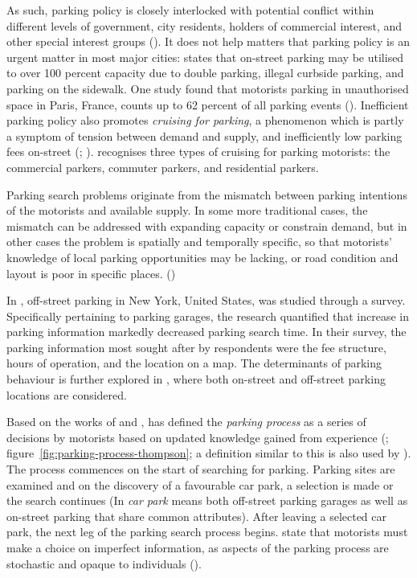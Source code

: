 As such, parking policy is closely interlocked with potential conflict within different levels of government, city residents, holders of commercial interest, and other special interest groups (\cite{Ker1988}). It does not help matters that parking policy is an urgent matter in most major cities: \cite{Arnott2006} states that on-street parking may be utilised to over 100 percent capacity due to double parking, illegal curbside parking, and parking on the sidewalk. One study found that motorists parking in unauthorised space in Paris, France, counts up to 62 percent of all parking events (\cite{Gantelet2006}). Inefficient parking policy also promotes \textit{cruising for parking}, a phenomenon which is partly a symptom of tension between demand and supply, and inefficiently low parking fees on-street (\cite{Shoup2004}; \citeyear{Shoup2006}).  recognises three types of cruising for parking motorists: the commercial parkers, commuter parkers, and residential parkers.

Parking search problems originate from the mismatch between parking intentions of the motorists and available supply. In some more traditional cases, the mismatch can be addressed with expanding capacity or constrain demand, but in other cases the problem is spatially and temporally specific, so that motorists' knowledge of local parking opportunities may be lacking, or road condition and layout is poor in specific places. (\cite{Axhausen1993})

In , off-street parking in New York, United States, was studied through a survey. Specifically pertaining to parking garages, the research quantified that increase in parking information markedly decreased parking search time. In their survey, the parking information most sought after by respondents were the fee structure, hours of operation, and the location on a map. The determinants of parking behaviour is further explored in , where both on-street and off-street parking locations are considered.

Based on the works of  and , \citeauthor{Thompson1998} has defined the \textit{parking process} as a series of decisions by motorists based on updated knowledge gained from experience (\citeyear{Thompson1998}; figure~\ref{fig:parking-process-thompson}; a definition similar to this is also used by \citeauthor{Guo2013}). The process commences on the start of searching for parking. Parking sites are examined and on the discovery of a favourable car park, a selection is made or the search continues (In  \textit{car park} means both off-street parking garages as well as on-street parking that share common attributes). After leaving a selected car park, the next leg of the parking search process begins. \citeauthor{Thompson1998} state that motorists must make a choice on imperfect information, as aspects of the parking process are stochastic and opaque to individuals (\citeyear{Thompson1998}).

